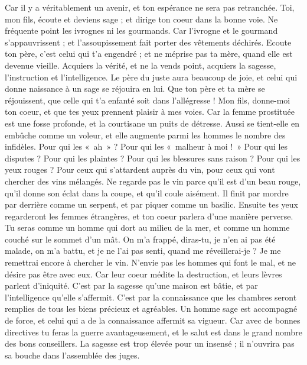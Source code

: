 \begin{multicols}{2}
Car il y a véritablement un avenir, et ton espérance ne sera pas retranchée.
Toi, mon fils, écoute et deviens sage ; et dirige ton coeur dans la bonne voie.
Ne fréquente point les ivrognes ni les gourmands.
Car l'ivrogne et le gourmand s’appauvrissent ; et l’assoupissement fait porter des vêtements déchirés.
Ecoute ton père, c’est celui qui t'a engendré ; et ne méprise pas ta mère, quand elle est devenue vieille.
Acquiers la vérité, et ne la vends point, acquiers la sagesse, l'instruction et l’intelligence.
Le père du juste aura beaucoup de joie, et celui qui donne naissance à un sage se réjouira en lui.
Que ton père et ta mère se réjouissent, que celle qui t'a enfanté soit dans l’allégresse !
Mon fils, donne-moi ton coeur, et que tes yeux prennent plaisir à mes voies.
Car la femme prostituée est une fosse profonde, et la courtisane un puits de détresse.
Aussi se tient-elle en embûche comme un voleur, et elle augmente parmi les hommes le nombre des infidèles.
Pour qui les «~ah~» ? Pour qui les «~malheur à moi !~» Pour qui les disputes ? Pour qui les plaintes ? Pour qui les blessures sans raison ? Pour qui les yeux rouges ?
Pour ceux qui s'attardent auprès du vin, pour ceux qui vont chercher des vins mélangés.
Ne regarde pas le vin parce qu’il est d’un beau rouge, qu’il donne son éclat dans la coupe, et qu'il coule aisément.
Il finit par mordre par derrière comme un serpent, et par piquer comme un basilic.
Ensuite tes yeux regarderont les femmes étrangères, et ton coeur parlera d’une manière perverse.
Tu seras comme un homme qui dort au milieu de la mer, et comme un homme couché sur le sommet d’un mât.
On m'a frappé, diras-tu, je n'en ai pas été malade, on m'a battu, et je ne l'ai pas senti, quand me réveillerai-je ? Je me remettrai encore à chercher le vin.
\VerseOne{}N'envie pas les hommes qui font le mal, et ne désire pas être avec eux.
Car leur coeur médite la destruction, et leurs lèvres parlent d’iniquité.
C’est par la sagesse qu’une maison est bâtie, et par l'intelligence qu’elle s’affermit.
C’est par la connaissance que les chambres seront remplies de tous les biens précieux et agréables.
Un homme sage est accompagné de force, et celui qui a de la connaissance affermit sa vigueur.
Car avec de bonnes directives tu feras la guerre avantageusement, et le salut est dans le grand nombre des bons conseillers.
La sagesse est trop élevée pour un insensé ; il n'ouvrira pas sa bouche dans l’assemblée des juges.

\end{multicols}
